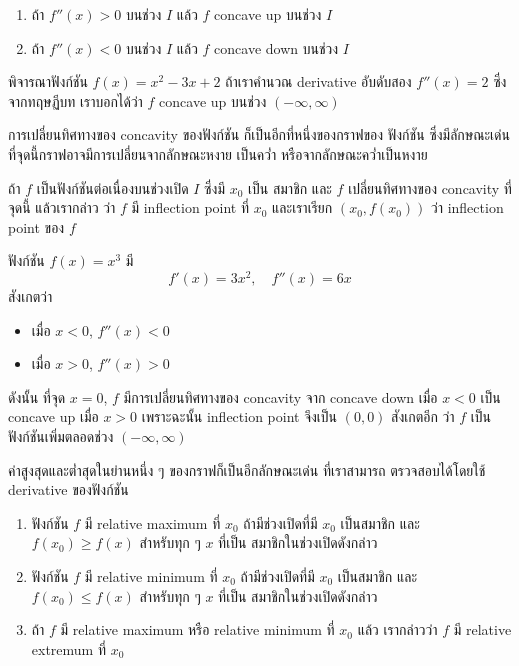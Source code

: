 \documentclass[
]{book}
\begin{document}
\begin{enumerate}
\def\labelenumi{\arabic{enumi}.}
\item
  ถ้า \(f''(x) > 0\) บนช่วง \(I\) แล้ว \(f\) concave up บนช่วง \(I\)
\item
  ถ้า \(f''(x) < 0\) บนช่วง \(I\) แล้ว \(f\) concave down บนช่วง \(I\)
\end{enumerate}

พิจารณาฟังก์ชัน \(f(x) = x^2-3x+2\) ถ้าเราคำนวณ derivative อับดับสอง
\(f''(x) = 2\) ซึ่งจากทฤษฏีบท เราบอกได้ว่า \(f\) concave up บนช่วง
\((-\infty,\infty)\)

การเปลี่ยนทิศทางของ concavity ของฟังก์ชัน ก็เป็นอีกที่หนึ่งของกราฟของ ฟังก์ชัน
ซึ่งมีลักษณะเด่น ที่จุดนี้กราฟอาจมีการเปลี่ยนจากลักษณะหงาย เป็นคว่ำ
หรือจากลักษณะคว่ำเป็นหงาย

ถ้า \(f\) เป็นฟังก์ชันต่อเนื่องบนช่วงเปิด \(I\) ซึ่งมี \(x_0\) เป็น สมาชิก และ \(f\)
เปลี่ยนทิศทางของ concavity ที่จุดนี้ แล้วเรากล่าว ว่า \(f\) มี inflection point ที่
\(x_0\) และเราเรียก \((x_0,f(x_0))\) ว่า inflection point ของ \(f\)

ฟังก์ชัน \(f(x) = x^3\) มี \[f'(x) = 3x^2, \quad f''(x) = 6x\] สังเกตว่า

\begin{itemize}
\item
  เมื่อ \(x<0\), \(f''(x) < 0\)
\item
  เมื่อ \(x>0\), \(f''(x) >0\)
\end{itemize}

ดังนั้น ที่จุด \(x=0\), \(f\) มีการเปลี่ยนทิศทางของ concavity จาก concave down เมื่อ
\(x<0\) เป็น concave up เมื่อ \(x>0\) เพราะฉะนั้น inflection point จึงเป็น
\((0,0)\) สังเกตอีก ว่า \(f\) เป็นฟังก์ชันเพิ่มตลอดช่วง \((-\infty,\infty)\)

ค่าสูงสุดและต่ำสุดในย่านหนึ่ง ๆ ของกราฟก็เป็นอีกลักษณะเด่น ที่เราสามารถ ตรวจสอบได้โดยใช้
derivative ของฟังก์ชัน

\begin{enumerate}
\def\labelenumi{\arabic{enumi}.}
\item
  ฟังก์ชัน \(f\) มี relative maximum ที่ \(x_0\) ถ้ามีช่วงเปิดที่มี \(x_0\) เป็นสมาชิก
  และ \(f(x_0) \ge f(x)\) สำหรับทุก ๆ \(x\) ที่เป็น สมาชิกในช่วงเปิดดังกล่าว
\item
  ฟังก์ชัน \(f\) มี relative minimum ที่ \(x_0\) ถ้ามีช่วงเปิดที่มี \(x_0\) เป็นสมาชิก
  และ \(f(x_0) \le f(x)\) สำหรับทุก ๆ \(x\) ที่เป็น สมาชิกในช่วงเปิดดังกล่าว
\item
  ถ้า \(f\) มี relative maximum หรือ relative minimum ที่ \(x_0\) แล้ว
  เรากล่าวว่า \(f\) มี relative extremum ที่ \(x_0\)
\end{enumerate}
\end{document}
